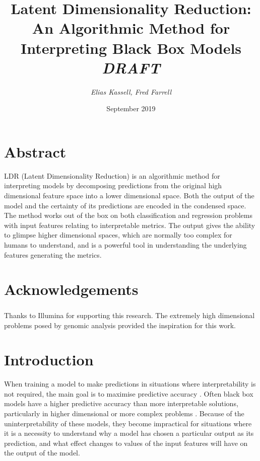 \documentclass[a4paper, twocolumn]{article}
\begin{document}
\title{\huge Latent Dimensionality Reduction: An Algorithmic Method for Interpreting Black Box Models \\
\Large \emph{DRAFT}}
\author{\emph{Elias Kassell, Fred Farrell}}
\date{September 2019}
\maketitle

\section{Abstract}\label{abstract}

LDR (Latent Dimensionality Reduction) is an algorithmic method for interpreting models by decomposing predictions from the original high dimensional feature space into a lower dimensional space. Both the output of the model and the certainty of its predictions are encoded in the condensed space. The method works out of the box on both classification and regression problems with input features relating to interpretable metrics. The output gives the ability to glimpse higher dimensional spaces, which are normally too complex for humans to understand, and is a powerful tool in understanding the underlying features generating the metrics.

\section*{Acknowledgements}

Thanks to Illumina\textsuperscript{\textregistered} for supporting this research. The extremely high dimensional problems posed by genomic analysis provided the inspiration for this work.

\section{Introduction}\label{Introduction}

When training a model to make predictions in situations where interpretability is not required, the main goal is to maximise predictive accuracy \cite{breiman2001statistical}. Often black box models have a higher predictive accuracy than more interpretable solutions, particularly in higher dimensional or more complex problems \cite{schmidhuber2015deep}. Because of the uninterpretability of these models, they become impractical for situations where it is a necessity to understand why a model has chosen a particular output as its prediction, and what effect changes to values of the input features will have on the output of the model.
\end{document}
